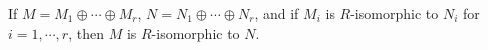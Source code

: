 If $M = M_1 \oplus \cdots \oplus M_r$, $N = N_1 \oplus \cdots \oplus N_r$, and if $M_i$ is $R$-isomorphic to $N_i$ for $i = 1, \cdots, r$, then $M$ is $R$-isomorphic to $N$.
